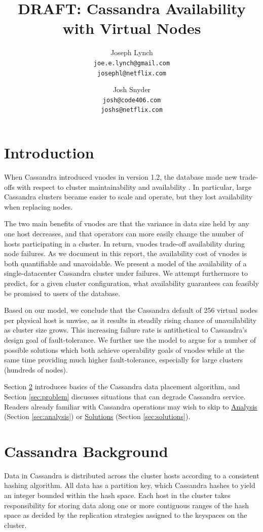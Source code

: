 \documentclass{article}
\title{DRAFT: Cassandra Availability with Virtual Nodes}
\author{
  Joseph Lynch\\
  \texttt{joe.e.lynch@gmail.com}\\
  \texttt{josephl@netflix.com}
  \and
  Josh Snyder\\
  \texttt{josh@code406.com}\\
  \texttt{joshs@netflix.com}
}
\begin{document}
\maketitle
\section{Introduction}
When Cassandra introduced vnodes in version 1.2, the database made new trade-offs
with respect to cluster maintainability and availability \cite{vnodes}. In particular,
large Cassandra clusters became easier to scale and operate, but they lost
availability when replacing nodes.

The two main benefits of vnodes are that the variance in data size held by any
one host decreases, and that operators can more easily change the number of
hosts participating in a cluster. In return, vnodes trade-off availability during
node failures. As we document in this report, the availability cost of vnodes is
both quantifiable and unavoidable. We present a model of the availability of a
single-datacenter Cassandra cluster under failures. We attempt furthermore
to predict, for a given cluster configuration, what availability guarantees
can feasibly be promised to users of the database.

Based on our model, we conclude that the Cassandra default of 256 virtual nodes
per physical host is unwise, as it results in steadily rising chance of
unavailability as cluster size grows. This increasing failure rate is
antithetical to Cassandra's design goal of fault-tolerance. We further use
the model to argue for a number of possible solutions which both achieve
operability goals of vnodes while at the same time providing much higher
fault-tolerance, especially for large clusters (hundreds of nodes).

Section \ref{sec:background} introduces basics of the Cassandra data placement
algorithm, and Section \ref{sec:problem} discusses situations that can degrade
Cassandra service. Readers already familiar with Cassandra operations may wish
to skip to \hyperref[sec:analysis]{Analysis} (Section \ref{sec:analysis}) or
\hyperref[sec:solutions]{Solutions} (Section \ref{sec:solutions}).

\section{Cassandra Background}
\label{sec:background}
Data in Cassandra is distributed across the cluster hosts according to a
consistent hashing algorithm. All data has a partition key, which Cassandra
hashes to yield an integer bounded within the hash space. Each host in the
cluster takes responsibility for storing data along one or more contiguous
ranges of the hash space as decided by the replication strategies assigned
to the keyspaces on the cluster.
\end{document}
